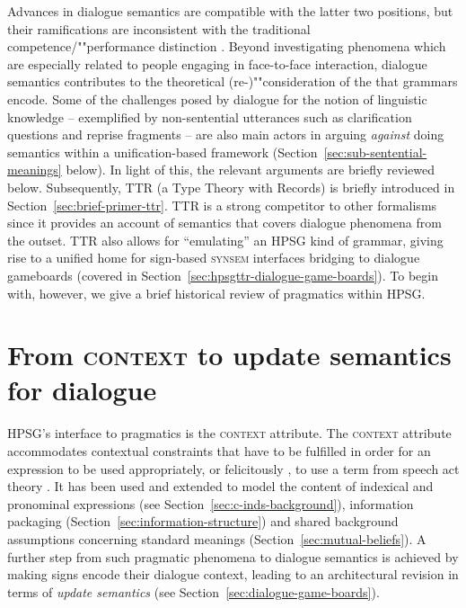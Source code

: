 \documentclass[output=paper]{langsci/langscibook}
\begin{document}
{Advances in dialogue semantics are compatible with the latter two positions, but their ramifications are inconsistent with the traditional competence/""performance distinction \citep{Ginzburg:Poesio:2016,Kempson:Cann:Gregoromichelaki:Chatzikyriakidis:2016}. 
%
Beyond investigating phenomena which are especially related to people engaging in face-to-face interaction, dialogue semantics contributes to the theoretical (re-)""consideration of the  that grammars encode.
%
Some of the challenges posed by dialogue for the notion of linguistic knowledge -- exemplified by non-sentential utterances such as clarification questions and reprise fragments \citep{Fernandez:Ginzburg:2002,Fernandez:Ginzburg:Lappin:2007} -- are also main actors in arguing \emph{against} doing semantics within a unification-based framework (Section~\ref{sec:sub-sentential-meanings} below).
%
In light of this, the relevant arguments are briefly reviewed below.
%
Subsequently, TTR (a Type Theory with Records) is briefly introduced in Section~\ref{sec:brief-primer-ttr}. TTR is a strong competitor to other formalisms since it provides an account of semantics that covers dialogue phenomena from the outset.
%
TTR also allows for \enquote{emulating} an HPSG kind of grammar, giving rise to a unified home for sign-based \textsc{synsem} interfaces bridging to dialogue gameboards (covered in Section~\ref{sec:hpsgttr-dialogue-game-boards}).
%
To begin with, however, we give a brief historical review of pragmatics within HPSG.







\section{From \textsc{context} to update semantics for dialogue}
\label{sec:history}

HPSG's interface to pragmatics is the \textsc{context} attribute. 
%
The \textsc{context} attribute accommodates contextual constraints that have to be fulfilled in order for an expression to be used appropriately, or felicitously \citep{Austin:1962}, to use a term from speech act theory \citep[]{Pollard:Sag:1994}.
%
It has been used and extended to model the content of indexical and pronominal expressions (see Section~\ref{sec:c-inds-background}), information packaging (Section~\ref{sec:information-structure}) and shared background assumptions concerning standard meanings (Section~\ref{sec:mutual-beliefs}).
%
A further step from such pragmatic phenomena to dialogue semantics is achieved  by making signs encode their dialogue context, leading to an architectural revision in terms of \emph{update semantics} (see Section~\ref{sec:dialogue-game-boards}).


}
\end{document}

